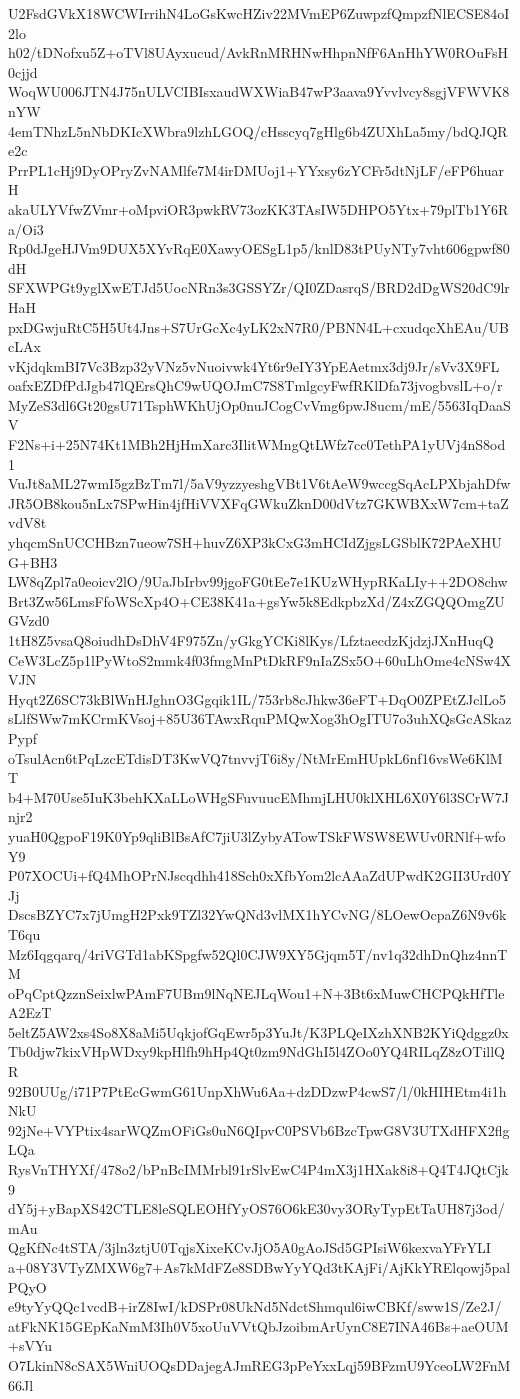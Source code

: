 U2FsdGVkX18WCWIrrihN4LoGsKwcHZiv22MVmEP6ZuwpzfQmpzfNlECSE84oI2lo
h02/tDNofxu5Z+oTVl8UAyxucud/AvkRnMRHNwHhpnNfF6AnHhYW0ROuFsH0cjjd
WoqWU006JTN4J75nULVCIBIsxaudWXWiaB47wP3aava9Yvvlvcy8sgjVFWVK8nYW
4emTNhzL5nNbDKIcXWbra9lzhLGOQ/cHsscyq7gHlg6b4ZUXhLa5my/bdQJQRe2c
PrrPL1cHj9DyOPryZvNAMlfe7M4irDMUoj1+YYxsy6zYCFr5dtNjLF/eFP6huarH
akaULYVfwZVmr+oMpviOR3pwkRV73ozKK3TAsIW5DHPO5Ytx+79plTb1Y6Ra/Oi3
Rp0dJgeHJVm9DUX5XYvRqE0XawyOESgL1p5/knlD83tPUyNTy7vht606gpwf80dH
SFXWPGt9yglXwETJd5UocNRn3s3GSSYZr/QI0ZDasrqS/BRD2dDgWS20dC9lrHaH
pxDGwjuRtC5H5Ut4Jns+S7UrGcXc4yLK2xN7R0/PBNN4L+cxudqcXhEAu/UBcLAx
vKjdqkmBI7Vc3Bzp32yVNz5vNuoivwk4Yt6r9eIY3YpEAetmx3dj9Jr/sVv3X9FL
oafxEZDfPdJgb47lQErsQhC9wUQOJmC7S8TmlgcyFwfRKlDfa73jvogbvslL+o/r
MyZeS3dl6Gt20gsU71TsphWKhUjOp0nuJCogCvVmg6pwJ8ucm/mE/5563IqDaaSV
F2Ns+i+25N74Kt1MBh2HjHmXarc3IlitWMngQtLWfz7cc0TethPA1yUVj4nS8od1
VuJt8aML27wmI5gzBzTm7l/5aV9yzzyeshgVBt1V6tAeW9wccgSqAcLPXbjahDfw
JR5OB8kou5nLx7SPwHin4jfHiVVXFqGWkuZknD00dVtz7GKWBXxW7cm+taZvdV8t
yhqcmSnUCCHBzn7ueow7SH+huvZ6XP3kCxG3mHCIdZjgsLGSblK72PAeXHUG+BH3
LW8qZpl7a0eoicv2lO/9UaJbIrbv99jgoFG0tEe7e1KUzWHypRKaLIy++2DO8chw
Brt3Zw56LmsFfoWScXp4O+CE38K41a+gsYw5k8EdkpbzXd/Z4xZGQQOmgZUGVzd0
1tH8Z5vsaQ8oiudhDsDhV4F975Zn/yGkgYCKi8lKys/LfztaecdzKjdzjJXnHuqQ
CeW3LcZ5p1lPyWtoS2mmk4f03fmgMnPtDkRF9nIaZSx5O+60uLhOme4cNSw4XVJN
Hyqt2Z6SC73kBlWnHJghnO3Ggqik1IL/753rb8cJhkw36eFT+DqO0ZPEtZJclLo5
sLlfSWw7mKCrmKVsoj+85U36TAwxRquPMQwXog3hOgITU7o3uhXQsGcASkazPypf
oTsulAcn6tPqLzcETdisDT3KwVQ7tnvvjT6i8y/NtMrEmHUpkL6nf16vsWe6KlMT
b4+M70Use5IuK3behKXaLLoWHgSFuvuucEMhmjLHU0klXHL6X0Y6l3SCrW7Jnjr2
yuaH0QgpoF19K0Yp9qliBlBsAfC7jiU3lZybyATowTSkFWSW8EWUv0RNlf+wfoY9
P07XOCUi+fQ4MhOPrNJscqdhh418Sch0xXfbYom2lcAAaZdUPwdK2GII3Urd0YJj
DscsBZYC7x7jUmgH2Pxk9TZl32YwQNd3vlMX1hYCvNG/8LOewOcpaZ6N9v6kT6qu
Mz6Iqgqarq/4riVGTd1abKSpgfw52Ql0CJW9XY5Gjqm5T/nv1q32dhDnQhz4nnTM
oPqCptQzznSeixlwPAmF7UBm9lNqNEJLqWou1+N+3Bt6xMuwCHCPQkHfTleA2EzT
5eltZ5AW2xs4So8X8aMi5UqkjofGqEwr5p3YuJt/K3PLQeIXzhXNB2KYiQdggz0x
Tb0djw7kixVHpWDxy9kpHlfh9hHp4Qt0zm9NdGhI5l4ZOo0YQ4RILqZ8zOTillQR
92B0UUg/i71P7PtEcGwmG61UnpXhWu6Aa+dzDDzwP4cwS7/l/0kHIHEtm4i1hNkU
92jNe+VYPtix4sarWQZmOFiGs0uN6QIpvC0PSVb6BzcTpwG8V3UTXdHFX2flgLQa
RysVnTHYXf/478o2/bPnBcIMMrbl91rSlvEwC4P4mX3j1HXak8i8+Q4T4JQtCjk9
dY5j+yBapXS42CTLE8leSQLEOHfYyOS76O6kE30vy3ORyTypEtTaUH87j3od/mAu
QgKfNc4tSTA/3jln3ztjU0TqjsXixeKCvJjO5A0gAoJSd5GPIsiW6kexvaYFrYLI
a+08Y3VTyZMXW6g7+As7kMdFZe8SDBwYyYQd3tKAjFi/AjKkYRElqowj5palPQyO
e9tyYyQQc1vcdB+irZ8IwI/kDSPr08UkNd5NdctShmqul6iwCBKf/sww1S/Ze2J/
atFkNK15GEpKaNmM3Ih0V5xoUuVVtQbJzoibmArUynC8E7INA46Bs+aeOUM+sVYu
O7LkinN8cSAX5WniUOQsDDajegAJmREG3pPeYxxLqj59BFzmU9YceoLW2FnM66Jl
